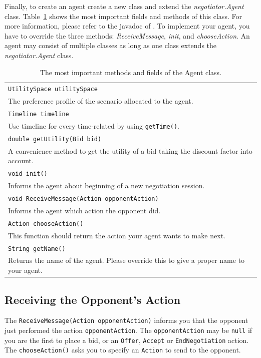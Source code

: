 \documentclass[]{article}
\begin{document}
Finally, to create an agent create a new class and extend the \textit{negotiator.Agent} class. Table~\ref{tab:agentclass} shows the most important fields and methods of this class. For more information, please refer to the javadoc of \Genius. To implement your agent, you have to override the three methods: \textit{ReceiveMessage}, \textit{init}, and \textit{chooseAction}. An agent may consist of multiple classes as long as one class extends the \textit{negotiator.Agent} class.

\begin{table}[h]
\begin{tabular}{m{}}
\hline
\texttt{UtilitySpace utilitySpace}\\
The preference profile of the scenario allocated to the agent.\\
\hline
\texttt{Timeline timeline}\\
Use timeline for every time-related by using \texttt{getTime()}.\\
\hline
\texttt{double getUtility(Bid bid)}\\
A convenience method to get the utility of a bid taking the discount factor into account.\\
\hline
\texttt{void init()}\\
Informs the agent about beginning of a new negotiation session.\\
\hline
\texttt{void ReceiveMessage(Action opponentAction)}\\
Informs the agent which action the opponent did.\\
\hline
\texttt{Action chooseAction()}\\
This function should return the action your agent wants to make next.\\
\hline
\texttt{String getName()}\\
Returns the name of the agent. Please override this to give a proper name to your agent.\\
\hline
\end{tabular}
\caption{The most important methods and fields of the Agent class.}
\label{tab:agentclass}
\end{table}

\subsection{Receiving the Opponent's Action}\label{sec:receiveAction}
The \texttt{ReceiveMessage(Action opponentAction)} informs you that the opponent just performed the action \texttt{opponentAction}. The \texttt{opponentAction} may be  \texttt{null} if you are the first to place a bid, or an \texttt{Offer}, \texttt{Accept} or \texttt{EndNegotiation} action.
The \texttt{chooseAction()} asks you to specify an \texttt{Action} to send to the opponent.
\end{document}
